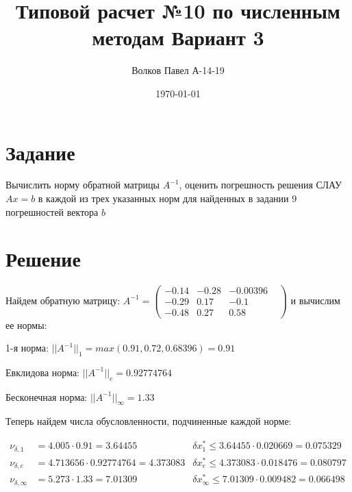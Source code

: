 \documentclass[a4paper,12pt]{report} %
\author{Волков Павел А-14-19}
\title{Типовой расчет №10 по численным методам Вариант 3}
\date{\today}
\begin{document}

\maketitle

\newpage
\section*{Задание}

Вычислить норму обратной матрицы $A^{-1}$, оценить погрешность решения СЛАУ $Ax = b$ в каждой из трех указанных норм для найденных в задании 9 погрешностей вектора $b$

\section*{Решение}

Найдем обратную матрицу: $A^{-1} = \begin{pmatrix} -0.14 & -0.28 & -0.00396 \\ -0.29 & 0.17 & -0.1 & \\ -0.48 & 0.27 & 0.58 \end{pmatrix}$ и вычислим ее нормы:

1-я норма:  $||A^{-1}||_1 = max(0.91, 0.72, 0.68396) = 0.91$

Евклидова норма: $||A^{-1}||_e = 0.92774764$

Бесконечная норма: $||A^{-1}||_{\infty} =1.33 $

\vspace{2em}
Теперь найдем числа обусловленности, подчиненные каждой норме:

\begin{align*}
	\nu_{\delta, 1} &= 4.005 \cdot 0.91 = 3.64455 & \delta x^*_1 \leq 3.64455 \cdot 0.020669 = 0.075329\\
	\nu_{\delta, e} &= 4.713656 \cdot 0.92774764 = 4.373083 & \delta x^*_e \leq 4.373083 \cdot 0.018476 = 0.080797\\
	\nu_{\delta, \infty} &= 5.273 \cdot 1.33 = 7.01309 & \delta x^*_{\infty} \leq 7.01309 \cdot 0.009482 = 0.066498
\end{align*}
\end{document}
